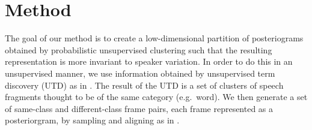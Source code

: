 \section{Method}
\label{sec:method}

The goal of our method is to create a low-dimensional partition of posteriograms obtained by probabilistic unsupervised clustering such that the resulting representation is more invariant to speaker variation.
In order to do this in an unsupervised manner, we use information obtained by unsupervised term discovery (UTD) as in \parencite{jansen2011efficient}.
The result of the UTD is a set of clusters of speech fragments thought to be of the same category (e.g.\ word).
We then generate a set of same-class and different-class frame pairs, each frame represented as a posteriorgram, by sampling and aligning as in \parencite{thiolliere2015hybrid}.




